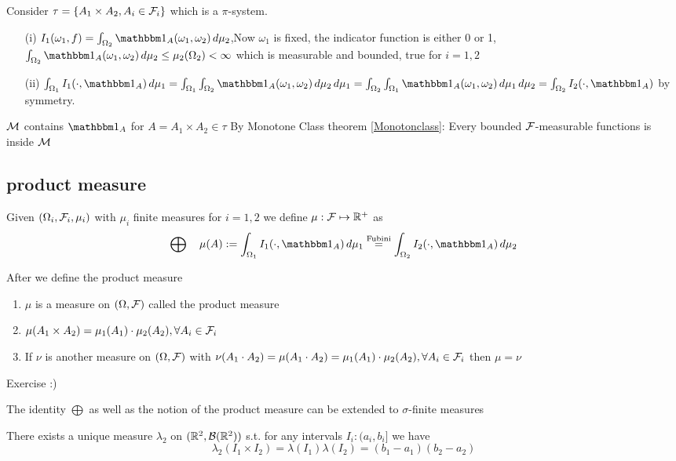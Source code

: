 Consider $\tau = \{A_1 \times A_2, A_i\in \mathcal{F}_i\}$ which is a $\pi$-system. 
\begin{enumerate}
    \item[(i)] $I_1(\omega_1, f) = \int_{\Omega_2} \I_A(\omega_1, \omega_2) \diff \mu_2$,Now $\omega_1$ is fixed, the indicator function is either 0 or 1, $\int_{\Omega_2} \I_A(\omega_1, \omega_2) \diff \mu_2 \leq \mu_2 (\Omega_2) < \infty$ which is measurable and bounded, true for $i=1,2$
    \item[(ii)] $\int_{\Omega_1} I_1(\cdot, \I_A) \diff \mu_1 = \int_{\Omega_1}\int_{\Omega_2} \I_A(\omega_1, \omega_2)\diff \mu_2 \diff \mu_1 = \int_{\Omega_2}\int_{\Omega_1} \I_A(\omega_1, \omega_2)\diff \mu_1 \diff \mu_2 = \int_{\Omega_2} I_2(\cdot, \I_A)$ by symmetry. 
\end{enumerate}
$\mathcal{M}$ contains $\I_A$ for $A = A_1 \times A_2 \in \tau$
By Monotone Class theorem \ref{Monotonclass}: Every bounded $\mathcal{F}$-measurable functions is inside $\mathcal{M}$


\newpage
\subsection*{product measure}
Given $(\Omega_i, \mathcal{F}_i, \mu_i)$ with $\mu_i$ finite measures for $i=1,2$ we define $\mu: \mathcal{F} \mapsto \mathbb{R}^+$ as 
\begin{equation*}
    \bigoplus \quad \mu(A) := \int_{\Omega_1} I_1(\cdot, \I_A) \diff \mu_1 \stackrel{\text{Fubini}}{=} \int_{\Omega_2} I_2(\cdot, \I_A) \diff \mu_2
\end{equation*}
\begin{prop} After we define the product measure
\begin{enumerate}
    \item $\mu$ is a measure on $(\Omega, \mathcal{F})$ called the product measure
    \item $\mu(A_1 \times A_2) = \mu_1(A_1)\cdot \mu_2(A_2), \forall A_i \in \mathcal{F}_i$
    \item If $\nu$ is another measure on $(\Omega, \mathcal{F})$ with $\nu(A_1 \cdot A_2) =\mu(A_1 \cdot A_2) = \mu_1(A_1)\cdot \mu_2(A_2), \forall A_i \in \mathcal{F}_i$ then $\mu = \nu$
\end{enumerate}
\end{prop}
\pf Exercise :)

\begin{rem}
The identity $\bigoplus$ as well as the notion of the product measure can be extended to $\sigma$-finite measures
\end{rem}
\begin{cor}There exists a unique measure $\lambda_2$ on $(\mathbb{R}^2, \mathcal{B}(\mathbb{R}^2))$ s.t. for any intervals $I_i: (a_i, b_i]$ we have
\begin{equation*}
    \lambda_2(I_1 \times I_2) = \lambda(I_1)\lambda(I_2) = (b_1 - a_1)(b_2 - a_2)
\end{equation*}
\end{cor}

